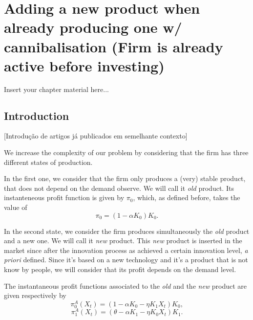 
\chapter{Adding a new product when already producing one w/ cannibalisation (Firm is already active before investing)}
\label{chapter:3}


Insert your chapter material here...

\section{Introduction}
\label{section:2_intro}

[Introdução de artigos já publicados em semelhante contexto]

We increase the complexity of our problem by considering that the firm has three different states of production.

In the first one, we consider that the firm only produces a (very) stable product, that does not depend on the demand observe. We will call it \textit{old} product. Its instanteneous profit function is given by $\pi_0$, which, as defined before, takes the value of
$$\pi_0= (1-\alpha K_0)K_0.$$

In the second state, we consider the firm produces simultaneously the \textit{old} product and a new one. We will call it \textit{new} product. This \textit{new} product is inserted in the market since after the innovation process as achieved a certain innovation level, \textit{a priori} defined. Since it's based on a new technology and it's a product that is not know by people, we will consider that its profit depends on the demand level.

The instantaneous profit functions associated to the \textit{old} and the \textit{new} product are given respectively by
$$\pi_0^A(X_t)=(1-\alpha K_0-\eta K_1 X_t) K_0,$$
$$\pi_1^A(X_t)=(\theta-\alpha K_1-\eta K_0 X_t) K_1.$$



